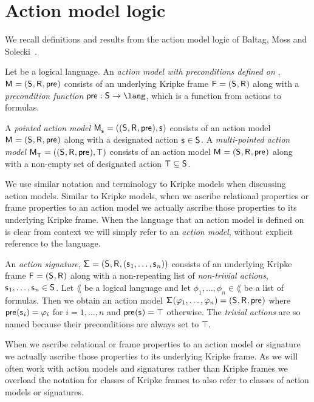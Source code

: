 \section{Action model logic}\label{aml}

We recall definitions and results from the action model logic of Baltag, Moss and Solecki~\cite{baltag:1998,baltag:2004}.

\begin{definition}
Let \lang{} be a logical language.
An {\em action model with preconditions defined on \lang{}}, $\aModelAndTuple$ consists of an underlying Kripke frame $\aFrameAndTuple$ along with a {\em precondition function} $\aPrecondition : \aStates \to \lang$, which is a function from actions to formulas.

A {\em pointed action model} $\aPModelAndTuple{\aStateS}$ consists of an action model $\aModelAndTuple$ along with a designated action $\aStateS \in \aStates$.
A {\em multi-pointed action model} $\aPModelAndTuple{\aStatesT}$ consists of an action model $\aModelAndTuple$ along with a non-empty set of designated action $\aStatesT \subseteq \aStates$.
\end{definition}

We use similar notation and terminology to Kripke models when discussing action models.
Similar to Kripke models, when we ascribe relational properties or frame properties to an action model we actually ascribe those properties to its underlying Kripke frame.
When the language that an action model is defined on is clear from context we will simply refer to an {\em action model}, without explicit reference to the language.

\begin{definition}
An {\em action signature}, $\aSignatureAndTuple$ consists of an underlying Kripke frame $\aFrameAndTuple$ along with a non-repeating list of {\em non-trivial actions}, $\aStateS_1, \dots, \aStateS_n \in \aStates$.
Let $\lang$ be a logical language and let $\phi_1, \dots, \phi_n \in \lang$ be a list of formulas.
Then we obtain an action model $\aSignature(\phi_1, \dots, \phi_n) = \aModelTuple$ where $\aPrecondition(\aStateS_i) = \phi_i$ for $i = 1, \dots, n$ and $\aPrecondition(\aStateS) = \top$ otherwise.
The {\em trivial actions} are so named because their preconditions are always set to $\top$.
\end{definition}

When we ascribe relational or frame properties to an action model or signature we actually ascribe those properties to its underlying Kripke frame.
As we will often work with action models and signatures rather than Kripke frames we overload the notation for classes of Kripke frames to also refer to classes of action models or signatures.

